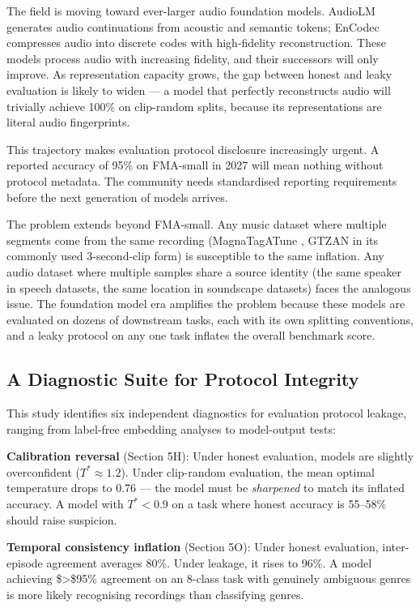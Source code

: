 \documentclass[conference]{IEEEtran}
\begin{document}
The field is moving toward ever-larger audio foundation models. AudioLM
\citep{borsos2023audiolm} generates audio continuations from acoustic
and semantic tokens; EnCodec \citep{defossez2023encodec} compresses
audio into discrete codes with high-fidelity reconstruction. These
models process audio with increasing fidelity, and their successors will
only improve. As representation capacity grows, the gap between honest
and leaky evaluation is likely to widen --- a model that perfectly
reconstructs audio will trivially achieve 100\% on clip-random splits,
because its representations are literal audio fingerprints.

This trajectory makes evaluation protocol disclosure increasingly
urgent. A reported accuracy of 95\% on FMA-small in 2027 will mean
nothing without protocol metadata. The community needs standardised
reporting requirements before the next generation of models arrives.

The problem extends beyond FMA-small. Any music dataset where multiple
segments come from the same recording (MagnaTagATune
\citep{law2009magnatag}, GTZAN in its commonly used 3-second-clip form)
is susceptible to the same inflation. Any audio dataset where multiple
samples share a source identity (the same speaker in speech datasets,
the same location in soundscape datasets) faces the analogous issue. The
foundation model era amplifies the problem because these models are
evaluated on dozens of downstream tasks, each with its own splitting
conventions, and a leaky protocol on any one task inflates the overall
benchmark score.

\subsection{A Diagnostic Suite for Protocol
Integrity}\label{d.-a-diagnostic-suite-for-protocol-integrity}

This study identifies six independent diagnostics for evaluation
protocol leakage, ranging from label-free embedding analyses to
model-output tests:

\textbf{Calibration reversal} (Section 5H): Under honest evaluation,
models are slightly overconfident (\(T^* \approx 1.2\)). Under
clip-random evaluation, the mean optimal temperature drops to 0.76
--- the model must be \emph{sharpened} to match its inflated
accuracy. A model with \(T^* < 0.9\) on a task where honest accuracy is
55--58\% should raise suspicion.

\textbf{Temporal consistency inflation} (Section 5O): Under honest
evaluation, inter-episode agreement averages 80\%. Under leakage, it
rises to 96\%. A model achieving \$\textgreater\$95\% agreement on an
8-class task with genuinely ambiguous genres is more likely recognising
recordings than classifying genres.
\end{document}
